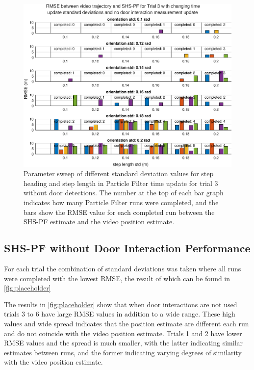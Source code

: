 \begin{figure}[H]
	\centering
	\includegraphics[width=0.8\linewidth]{"images/20201202_1344_orientation_std:_0_2_rad"}
	\setlength{\belowcaptionskip}{-15pt}
	\caption{Parameter sweep of different standard deviation values for step heading and step length in Particle Filter time update for trial 3 without door detections. The number at the top of each bar graph indicates how many Particle Filter runs were completed, and the bars show the RMSE value for each completed run between the SHS-PF estimate and the video position estimate. }
	\label{fig:rmsebetweenvideotrajectoryandshs-pffortrialnodetections31}
\end{figure}

\subsection{SHS-PF without Door Interaction Performance}

For each trial the combination of standard deviations was taken where all runs were completed with the lowest RMSE, the result of which can be found in \cref{fig:placeholder}

The results in \cref{fig:placeholder} show that when door interactions are not used trials 3 to 6 have large RMSE values in addition to a wide range. These high values and wide spread indicates that the position estimate are different each run and do not coincide with the video position estimate. Trials 1 and 2 have lower RMSE values and the spread is much smaller, with the latter indicating similar estimates between runs, and the former indicating varying degrees of similarity with the video position estimate.\par 

